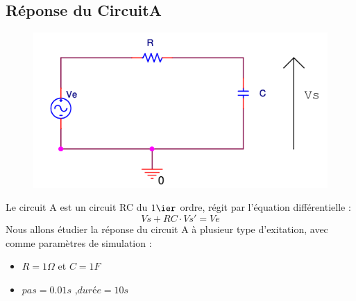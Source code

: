 \documentclass[a4paper,11pt]{article}
\begin{document}
\newpage


  \subsection{Réponse du CircuitA}
  \begin{figure}[H]
	 \begin{center}
	\includegraphics[scale=.5]{circuitA}
	\end{center}
      \end{figure}
   Le circuit A est un circuit RC du $1\ier$ ordre, régit par l'équation différentielle :
   \begin{equation*}
    Vs+RC\cdot Vs'=Ve
   \end{equation*}
  Nous allons étudier la réponse du circuit A à plusieur type d'exitation, avec comme paramètres de simulation :  \\
  \begin{itemize}
   \item $R = 1 \Omega$ et $C = 1 F$
     \item $pas = 0.01 s$ ,$durée = 10s$ 
  \end{itemize}
\end{document}
